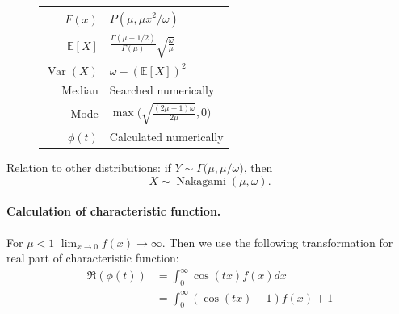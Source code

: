 \documentclass[a4paper,11pt]{article}
\theoremstyle{plain}
\theoremstyle{definition}
\newcommand{\ME}{\mathbb{E}}
\newcommand{\Var}{\operatorname{Var}}
\begin{document}
\begin{figure}[!htb]
\begin{minipage}{0.4\textwidth}
\begin{tabular}{| r | l |}
				\hline
				$F(x)$ & $P(\mu, \mu x^2/\omega) $\\
				\hline
				$\ME[X]$ & $ \frac{\Gamma(\mu + 1/2)}{\Gamma(\mu)} \sqrt{\frac{\omega}{\mu}}  $ \\
				\hline
				$\Var(X)$ & $\omega - (\ME[X])^2$ \\
				\hline
				Median & Searched numerically \\
				\hline
				Mode & $ \max \bigg( \sqrt{\frac{(2\mu-1)\omega}{2\mu}}, 0\bigg)$ \\
				\hline
				$\phi(t)$ & Calculated numerically \\
				\hline
			\end{tabular}
		\end{minipage}
	\end{figure}
	
	Relation to other distributions: if $Y \sim \Gamma\big(\mu, \mu/\omega\big)$, then
	\[
	X \sim \operatorname{Nakagami}(\mu, \omega).
	\]
	
	\paragraph{Calculation of characteristic function.} For $\mu < 1$ $\lim_{x \rightarrow 0}f(x) \rightarrow \infty$. Then we use the following transformation for real part of characteristic function:
	\[
	\begin{aligned}
	\Re(\phi(t)) & = \int_{0}^{\infty} \cos(tx) f(x) dx \\ &= \int_{0}^{\infty} (\cos(tx)-1) f(x) + 1
	\end{aligned}
	\]
	
\end{document}
